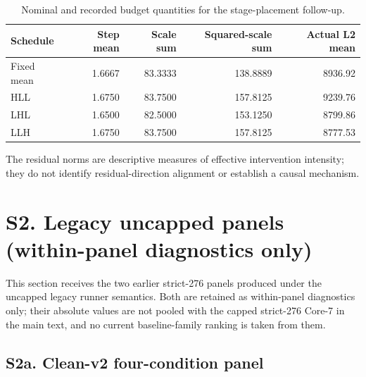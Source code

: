 \documentclass[10pt]{article}
\begin{document}
\begin{table}[h]
\centering\small
\caption{Nominal and recorded budget quantities for the stage-placement follow-up.}
\begin{tabular}{lrrrr}
\toprule
Schedule & Step mean & Scale sum & Squared-scale sum & Actual L2 mean \\
\midrule
Fixed mean & 1.6667 & 83.3333 & 138.8889 & 8936.92 \\
HLL & 1.6750 & 83.7500 & 157.8125 & 9239.76 \\
LHL & 1.6500 & 82.5000 & 153.1250 & 8799.86 \\
LLH & 1.6750 & 83.7500 & 157.8125 & 8777.53 \\
\bottomrule
\end{tabular}
\end{table}

The residual norms are descriptive measures of effective intervention
intensity; they do not identify residual-direction alignment or establish a
causal mechanism.

\section{S2. Legacy uncapped panels (within-panel diagnostics only)}

This section receives the two earlier strict-276 panels produced under the
uncapped legacy runner semantics. Both are retained as within-panel
diagnostics only; their absolute values are not pooled with the capped
strict-276 Core-7 in the main text, and no current baseline-family ranking
is taken from them.

\subsection{S2a. Clean-v2 four-condition panel}

\begin{table}[h]
\centering\scriptsize
{}
\caption{Strict-276 main-adapter clean-v2 panel (legacy uncapped semantics).
Metrics are pre-save float-evaluation means over the same six unique views;
the Full-SSIM column is an audit value, not the saved-artifact branch.}
\end{table}
\end{document}
